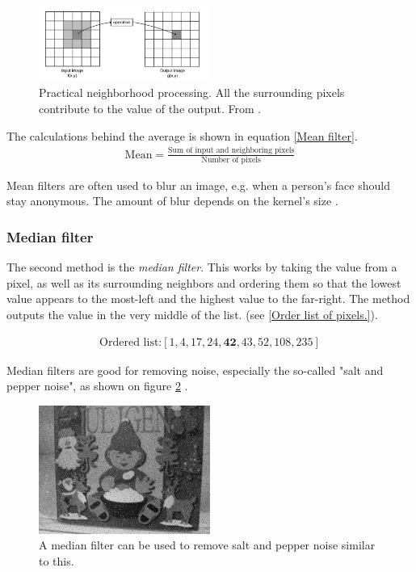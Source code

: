 \begin{figure}[htbp] 
\centering 
\includegraphics[width=0.5\textwidth]{Pictures/Theory/neighborhood_processing.png} 
\caption{Practical neighborhood processing. All the surrounding pixels contribute to the value of the output. From \citep{ip_book}.} 
\label{fig:neigh_pros} 
\end{figure}

The calculations behind the average is shown in equation \ref{Mean filter}.
\begin{equation}
	\begin{aligned}
	\text{Mean} = \frac{\text{Sum of input and neighboring pixels}}{\text{Number of pixels}}
	\label{Mean filter}
	\end{aligned}
\end{equation}

Mean filters are often used to blur an image, e.g. when a person's face should stay anonymous. The amount of blur depends on the kernel's size \citep{ip_book}.

\subsubsection{Median filter}
The second method is the \textit{median filter}. This works by taking the value from a pixel, as well as its surrounding neighbors and ordering them so that the lowest value appears to the most-left and the highest value to the far-right. The method outputs the value in the very middle of the list. (see \ref{Order list of pixels.}).

\begin{equation}
\begin{aligned}{
\text{Ordered list:}[1,4,17,24,\boldsymbol{42},43,52,108,235]
	\label{Order list of pixels.}}	
	\end{aligned}
\end{equation}

Median filters are good for removing noise, especially the so-called "salt and pepper noise", as shown on figure \ref{fig:salt} \citep{ip_book}.
\begin{figure}[htbp]
\centering
\includegraphics[width=0.5\textwidth]{Pictures/Theory/saltNoise}
\caption{A median filter can be used to remove salt and pepper noise similar to this.}
\label{fig:salt}
\end{figure}

